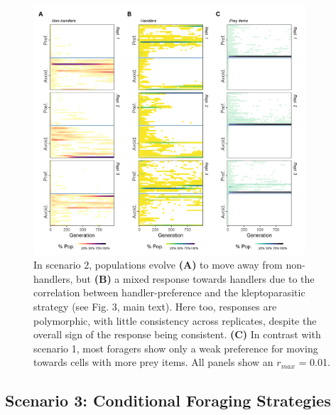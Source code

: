 \documentclass[11pt]{article}
\begin{document}
\begin{figure}[h!]
        \centering
        \includegraphics*[width=0.9\textwidth]{figures/fig_wt_evo_obligate.png}
        \caption{In scenario 2, populations evolve \textbf{(A)} to move away from non-handlers, but \textbf{(B)} a mixed response towards handlers due to the correlation between handler-preference and the kleptoparasitic strategy (see Fig. 3, main text).
        Here too, responses are polymorphic, with little consistency across replicates, despite the overall sign of the response being consistent.
        \textbf{(C)} In contrast with scenario 1, most foragers show only a weak preference for moving towards cells with more prey items.
        All panels show an $r_{max}$ = 0.01.}
\end{figure}

\newpage

\subsection{Scenario 3: Conditional Foraging Strategies}
\end{document}
